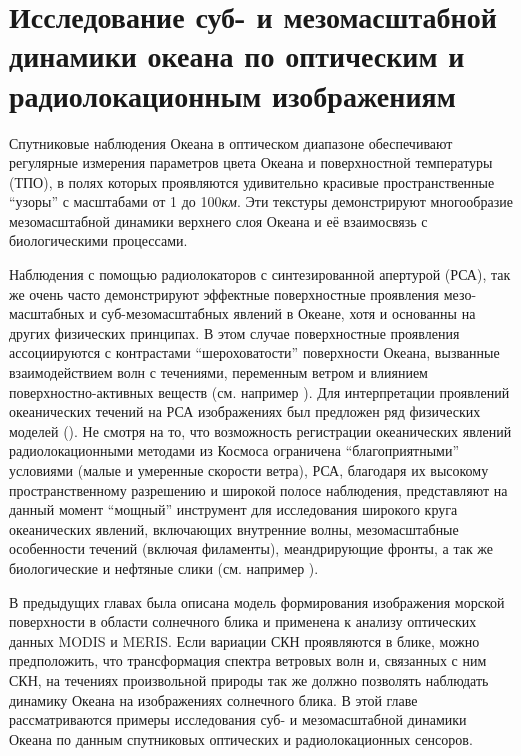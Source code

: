\chapter{Исследование суб- и мезомасштабной динамики океана по оптическим и радиолокационным изображениям} \label{chap:3}



Спутниковые наблюдения Океана в оптическом диапазоне обеспечивают регулярные измерения параметров цвета Океана и поверхностной температуры (ТПО), в полях которых проявляются удивительно красивые пространственные ``узоры'' с масштабами от 1 до 100\textit{км}. Эти текстуры демонстрируют многообразие мезомасштабной динамики верхнего слоя Океана и её взаимосвязь с биологическими процессами.

Наблюдения с помощью радиолокаторов с синтезированной апертурой (РСА), так же очень часто демонстрируют эффектные поверхностные проявления мезо-масштабных и суб-мезомасштабных явлений в Океане, хотя и основанны на других физических принципах. В этом случае поверхностные проявления ассоциируются с контрастами ``шероховатости'' поверхности Океана, вызванные взаимодействием волн с течениями, переменным ветром и влиянием поверхностно-активных веществ (см. например \citep{Marmorino1994, Johannessen1996, Jansen1998, Kudryavtsev2005, Johannessen2005}). Для интерпретации проявлений океанических течений на РСА изображениях был предложен ряд физических моделей (\citep{Alpers1984, Romeiser1997, Kudryavtsev2005}). Не смотря на то, что возможность регистрации океанических явлений радиолокационными методами из Космоса ограничена ``благоприятными'' условиями (малые и умеренные скорости ветра), РСА, благодаря их высокому пространственному разрешению и широкой полосе наблюдения, представляют на данный момент ``мощный'' инструмент для исследования широкого круга океанических явлений, включающих внутренние волны, мезомасштабные особенности течений (включая филаменты), меандрирующие фронты, а так же биологические и нефтяные слики (см. например \citep{Gasparovic1988, Lyzenga1988, Johannessen1996, Beal1997, Espedal1998, Gade1998, Gade1998b}).

В предыдущих главах была описана модель формирования изображения морской поверхности в области солнечного блика и применена к анализу оптических данных MODIS и MERIS. Если вариации СКН проявляются в блике, можно предположить, что трансформация спектра ветровых волн и, связанных с ним СКН, на течениях произвольной природы так же должно позволять наблюдать динамику Океана на изображениях солнечного блика. В этой главе рассматриваются примеры исследования суб- и мезомасштабной динамики Океана по данным спутниковых оптических и радиолокационных сенсоров.



